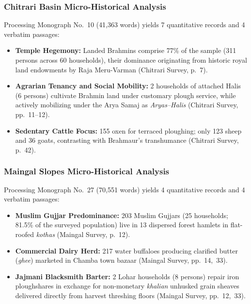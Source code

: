 \documentclass[11pt,a4paper]{article}
\begin{document}
\subsubsection{Chitrari Basin Micro-Historical Analysis}
Processing Monograph No.~10 (41,363 words) yields 7 quantitative records and 4 verbatim passages:
\begin{itemize}[leftmargin=*]
    \item \textbf{Temple Hegemony:} Landed Brahmins comprise 77\% of the sample (311 persons across 60 households), their dominance originating from historic royal land endowments by Raja Meru-Varman (Chitrari Survey, p.~7).
    \item \textbf{Agrarian Tenancy and Social Mobility:} 2 households of attached Halis (6 persons) cultivate Brahmin land under customary plough service, while actively mobilizing under the Arya Samaj as \textit{Aryas--Halis} (Chitrari Survey, pp.~11--12).
    \item \textbf{Sedentary Cattle Focus:} 155 oxen for terraced ploughing; only 123 sheep and 36 goats, contrasting with Brahmaur's transhumance (Chitrari Survey, p.~42).
\end{itemize}

\subsubsection{Maingal Slopes Micro-Historical Analysis}
Processing Monograph No.~27 (70,551 words) yields 4 quantitative records and 4 verbatim passages:
\begin{itemize}[leftmargin=*]
    \item \textbf{Muslim Gujjar Predominance:} 203 Muslim Gujjars (25 households; 81.5\% of the surveyed population) live in 13 dispersed forest hamlets in flat-roofed \textit{kothas} (Maingal Survey, p.~12).
    \item \textbf{Commercial Dairy Herd:} 217 water buffaloes producing clarified butter (\textit{ghee}) marketed in Chamba town bazaar (Maingal Survey, pp.~14,~33).
    \item \textbf{Jajmani Blacksmith Barter:} 2 Lohar households (8 persons) repair iron ploughshares in exchange for non-monetary \textit{khalian} unhusked grain sheaves delivered directly from harvest threshing floors (Maingal Survey, pp.~12,~33).
\end{itemize}
\end{document}

